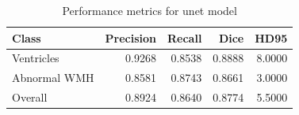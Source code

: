 \begin{table}
\caption{Performance metrics for unet model}
\label{tab:unet_metrics}
\begin{tabular}{lrrrr}
\toprule
Class & Precision & Recall & Dice & HD95 \\
\midrule
Ventricles & 0.9268 & 0.8538 & 0.8888 & 8.0000 \\
Abnormal WMH & 0.8581 & 0.8743 & 0.8661 & 3.0000 \\
Overall & 0.8924 & 0.8640 & 0.8774 & 5.5000 \\
\bottomrule
\end{tabular}
\end{table}
